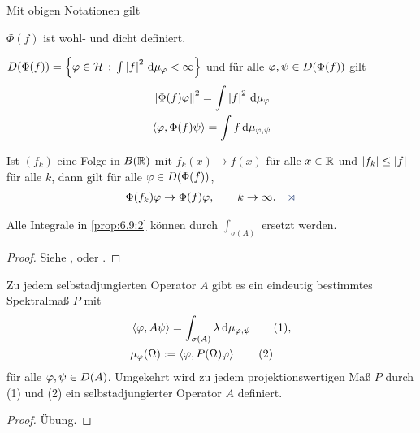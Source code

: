 \begin{prop}
\label{prop:6.9}
Mit obigen Notationen gilt
\begin{propenum}
\item $\Phi(f)$ ist wohl- und dicht definiert.
\item\label{prop:6.9:2} $D(\Phi(f)) = \left\{ \varphi\in\mathcal{H}\,:\,\int \left|f\right|^2\,\mathrm{d} \mu_\varphi
< \infty\right\}$ und für alle $\varphi,\psi\in D(\Phi(f))$ gilt
\begin{align*}
&\left\|\Phi(f)\varphi\right\|^2 = \int \left|f\right|^2\,\mathrm{d} \mu_\varphi\\
&\left\langle\varphi,\Phi(f)\psi\right\rangle = \int f \,\mathrm{d} \mu_{\varphi,\psi}
\end{align*}
\item Ist $(f_k)$ eine Folge in $B(\mathbb{R})$ mit $f_k(x)\to f(x)$ für alle $x\in\mathbb{R}$
und $\left|f_k\right|\le \left|f\right|$ für alle $k$, dann gilt für alle $\varphi\in D(\Phi(f))$,
\begin{align*}
\Phi(f_k)\ph \to \Phi(f)\ph,\qquad k\to\infty.\fishhere
\end{align*}
\end{propenum}
\end{prop}

\begin{bem*}
Alle Integrale in \ref{prop:6.9:2} können durch $\int_{\sigma(A)}$ ersetzt
werden.\maphere
\end{bem*}

\begin{proof}
Siehe \cite{RS95a}, \cite{Wer07} oder \cite[Kapitel 12]{Mmq08}.\qedhere
\end{proof}

\begin{thm}[Spektralsatz]
\label{prop:6.10}
Zu jedem selbstadjungierten Operator $A$ gibt es ein eindeutig bestimmtes
Spektralmaß $P$ mit
\begin{align*}
&\left\langle\varphi, A\psi\right\rangle = \int_{\sigma(A)} \lambda \,\mathrm{d} \mu_{\varphi,\psi}\tag{1},\\
&\mu_\varphi(\Omega) := \left\langle\varphi,P(\Omega)\varphi\right\rangle\tag{2}
\end{align*}
für alle $\varphi,\psi\in D(A)$. Umgekehrt wird zu jedem projektionswertigen Maß $P$
durch (1) und (2) ein selbstadjungierter Operator $A$ definiert.\fishhere
\end{thm}
\begin{proof}
Übung.\qedhere
\end{proof}

